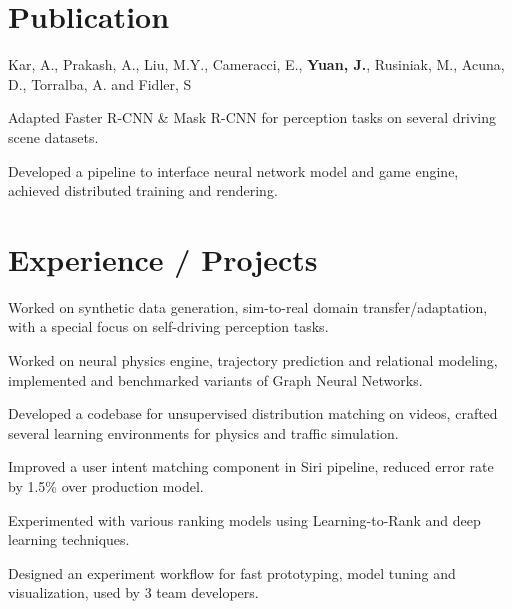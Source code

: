 \documentclass[]{deedy-resume-openfont}
\begin{document}
\hfill
\begin{minipage}[t]{0.66\textwidth} 


\section{Publication}
\vspace{\topsep} %

\begin{tightemize}
    \item Kar, A., Prakash, A., Liu, M.Y., Cameracci, E., \textbf{Yuan, J.}, Rusiniak, M., Acuna, D., Torralba, A. and Fidler, S
    \item Adapted Faster R-CNN \& Mask R-CNN for perception tasks on several driving scene datasets.
    \item Developed a pipeline to interface neural network model and game engine, achieved distributed training and rendering.
\end{tightemize}

\section{Experience / Projects}

\begin{tightemize}
    \item Worked on synthetic data generation, sim-to-real domain transfer/adaptation, with a special focus on self-driving perception tasks. 
    \item Worked on neural physics engine, trajectory prediction and relational modeling, implemented and benchmarked variants of Graph Neural Networks. 
    \item Developed a codebase for unsupervised distribution matching on videos, crafted several learning environments for physics and traffic simulation.
\end{tightemize}

\sectionsep
{}
\begin{tightemize}
    \item Improved a user intent matching component in Siri pipeline, reduced error rate by 1.5\% over production model. 
    \item Experimented with various ranking models using Learning-to-Rank and deep learning techniques.
    \item Designed an experiment workflow for fast prototyping, model tuning and visualization, used by 3 team developers.  
\end{tightemize}


\end{minipage}
\end{document}
